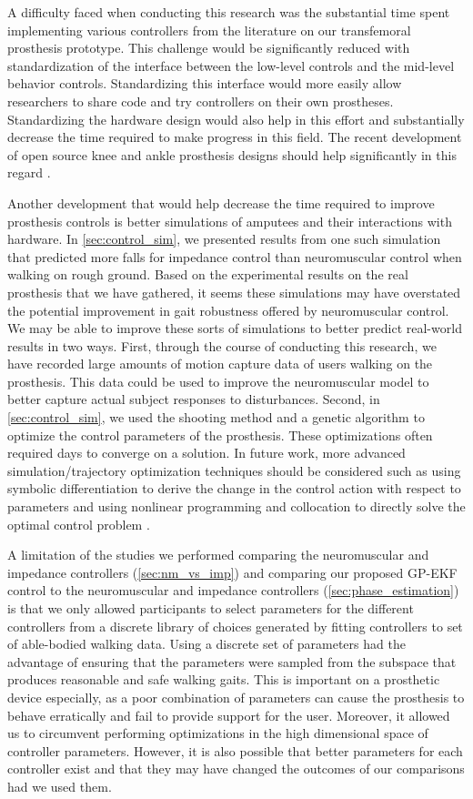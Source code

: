 A difficulty faced when conducting this research was the substantial time spent
implementing various controllers from the literature on our transfemoral
prosthesis prototype.  This challenge would be significantly reduced with
standardization of the interface between the low-level controls and the
mid-level behavior controls. Standardizing this interface would more easily
allow researchers to share code and try controllers on their own prostheses.
Standardizing the hardware design would also help in this effort and
substantially decrease the time required to make progress in this field. The
recent development of open source knee and ankle prosthesis designs should help
significantly in this regard \citep{azocar2018design}.

Another development that would help decrease the time required to improve
prosthesis controls is better simulations of amputees and their interactions
with hardware. In \cref{sec:control_sim}, we presented results from one such
simulation that predicted more falls for impedance control than neuromuscular
control when walking on rough ground. Based on the experimental results on the
real prosthesis that we have gathered, it seems these simulations may have
overstated the potential improvement in gait robustness offered by neuromuscular
control. We may be able to improve these sorts of simulations to better predict
real-world results in two ways. First, through the course of conducting this
research, we have recorded large amounts of motion capture data of users walking
on the prosthesis. This data could be used to improve the neuromuscular model to
better capture actual subject responses to disturbances. Second, in
\cref{sec:control_sim}, we used the shooting method and a genetic algorithm
\citep{hansen2006cma} to optimize the control parameters of the prosthesis.
These optimizations often required days to converge on a solution. In future
work, more advanced simulation/trajectory optimization techniques should be
considered such as using symbolic differentiation to derive the change in the
control action with respect to parameters and using nonlinear programming and
collocation to directly solve the optimal control problem
\citep{hargraves1987direct}. 

A limitation of the studies we performed comparing the neuromuscular and
impedance controllers (\cref{sec:nm_vs_imp}) and comparing our proposed GP-EKF
control to the neuromuscular and impedance controllers
(\cref{sec:phase_estimation}) is that we only allowed participants to select
parameters for the different controllers from a discrete library of choices
generated by fitting controllers to set of able-bodied walking data. Using a
discrete set of parameters had the advantage of ensuring that the parameters
were sampled from the subspace that produces reasonable and safe walking gaits.
This is important on a prosthetic device especially, as a poor combination of
parameters can cause the prosthesis to behave erratically and fail to provide
support for the user. Moreover, it allowed us to circumvent performing
optimizations in the high dimensional space of controller parameters. However,
it is also possible that better parameters for each controller exist and that
they may have changed the outcomes of our comparisons had we used them. 


